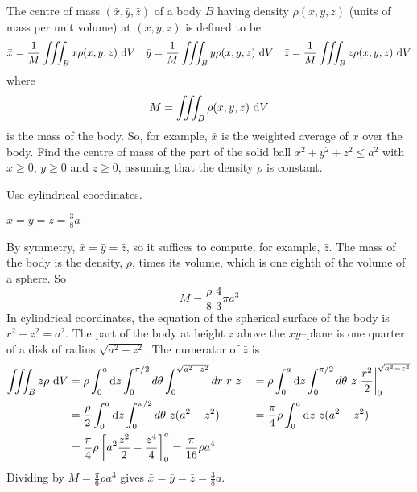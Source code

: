 \begin{question}
The centre of mass $(\bar x,\bar y, \bar z)$ of a body $B$ having
density $\rho(x,y,z)$ (units of mass per unit volume) at $(x,y,z)$ is defined
to be
\begin{equation*}
\bar x=\frac{1}{M}\iiint_B x\rho(x,y,z)\ \mathrm{d}V\quad
\bar y=\frac{1}{M}\iiint_B y\rho(x,y,z)\ \mathrm{d}V\quad
\bar z=\frac{1}{M}\iiint_B z\rho(x,y,z)\ \mathrm{d}V
\end{equation*}
where
\begin{equation*}
M=\iiint_B \rho(x,y,z)\ \mathrm{d}V
\end{equation*}
is the mass of the body. So, for example, $\bar x$ is the weighted average
of $x$ over the body. Find the centre of mass of the part of the solid
ball $x^2+y^2+z^2\le a^2$ with $x\ge 0$, $y\ge 0$ and $z\ge 0$, assuming
that the density $\rho$ is constant.
\end{question}

\begin{hint}
Use cylindrical coordinates.
\end{hint}

\begin{answer}
$\bar x=\bar y=\bar z=\frac{3}{8}a$
\end{answer}

\begin{solution}
By symmetry, $\bar x=\bar y=\bar z$, so it suffices to compute,
for example, $\bar z$.   The mass of the body is the density, $\rho$,
times its volume, which is one eighth of the volume of a sphere. So
\begin{equation*}
M=\frac{\rho}{8}\ \frac{4}{3}\pi a^3
\end{equation*}
In cylindrical coordinates, the equation of the spherical surface of the
body is $r^2+z^2=a^2$. The part of the body at height $z$ above the 
$xy$--plane is one quarter of a disk of radius $\sqrt{a^2-z^2}$. The numerator
of $\bar z$ is
\begin{alignat*}{3}
\iiint_B z\rho\ \mathrm{d}V
&=\rho\int_0^a \mathrm{d}z\int_0^{\pi/2}d\theta\int_0^{\sqrt{a^2-z^2}}dr\ r\ z
&&=\rho\int_0^a \mathrm{d}z\int_0^{\pi/2}d\theta\ z\ \frac{r^2}{2}
                                   \bigg|_0^{\sqrt{a^2-z^2}} \\
&=\frac{\rho}{2}\int_0^a \mathrm{d}z\int_0^{\pi/2}d\theta\ z(a^2-z^2)
&&=\frac{\pi}{4}\rho\int_0^a \mathrm{d}z\ z(a^2-z^2) \\
&=\frac{\pi}{4}\rho\left[a^2\frac{z^2}{2}-\frac{z^4}{4}\right]_0^a 
=\frac{\pi}{16}\rho a^4
\end{alignat*}
Dividing by $M=\frac{\pi}{6}\rho a^3$ gives 
$\bar x=\bar y=\bar z=\frac{3}{8}a$.
\end{solution}

